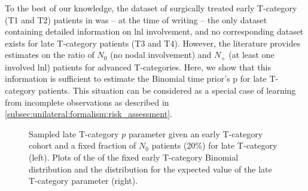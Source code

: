 \documentclass[\relativeRoot/main.tex]{subfiles}
\begin{document}
To the best of our knowledge, the dataset of surgically treated early T-category (T1 and T2) patients in \cite{sanguineti_defining_2009} was -- at the time of writing \cite{ludwig_hidden_2021} -- the only dataset containing detailed information on \gls{lnl} involvement, and no corresponding dataset exists for late T-category patients (T3 and T4). However, the literature provides estimates on the ratio of $N_0$ (no nodal involvement) and $N_+$ (at least one involved \gls{lnl}) patients for advanced T-categories. Here, we show that this information is sufficient to estimate the Binomial time prior's p for late T-category patients. This situation can be considered as a special case of learning from incomplete observations as described in \cref{subsec:unilateral:formalism:risk_assessment}.

\begin{figure}
    \centering
    \def\svgwidth{1.0\textwidth}
    
    \caption[Learned distribution over the late T-category's binomial parameter]{Sampled late T-category $p$ parameter given an early T-category cohort and a fixed fraction of $N_0$ patients (20\%) for late T-category (left). Plots of the  of the fixed early T-category Binomial distribution and the distribution for the expected value of the late T-category parameter (right).}
    \label{fig:unilateral:simultaneous_learned}
\end{figure}
\end{document}
